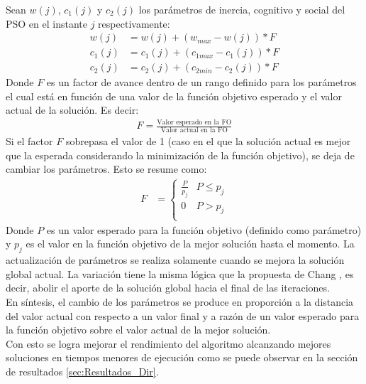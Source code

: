 Sean $w(j)$, $c_1(j)$ y $c_2(j)$ los parámetros de inercia, cognitivo y social del PSO en el instante $j$ respectivamente:  
\begin{align}\label{eq:VariationParameters_new}
    w(j) &= w(j) + (w_{max} - w(j)) * F \\\label{eq:VariationParameters_new_2}
    c_{1}(j) &= c_1(j) + (c_{1max} - c_1(j)) * F \\\label{eq:VariationParameters_new_3}
    c_{2}(j) &= c_2(j) + (c_{2min} - c_2(j)) * F
\end{align} 
Donde $F$ es un factor de avance dentro de un rango definido para los parámetros el cual está en función de una valor de la función objetivo esperado y el valor actual de la solución. Es decir: 
\begin{align}
  F = \frac{\text{Valor esperado en la FO}}{\text{Valor actual en la FO}}
\end{align}
Si el factor $F$ sobrepasa el valor de 1 (caso en el que la solución actual es mejor que la esperada considerando la minimización de la función objetivo), se deja de cambiar los parámetros. Esto se resume como:
\begin{align}\label{eq:restriction_var_par_new}
    F &= 
        \left\{
            \begin{array}{ll}
                \frac{P}{p_j}  & P \leq p_j\\
                0 & P > p_j\\
            \end{array}
        \right.
\end{align}
Donde $P$ es un valor esperado para la función objetivo (definido como parámetro) y $p_j$ es el valor en la función objetivo de la mejor solución hasta el momento. La actualización de parámetros se realiza solamente cuando se mejora la solución global actual. La variación tiene la misma lógica que la propuesta de Chang \cite{Chang10_2}, es decir, abolir el aporte de la solución global hacia el final de las iteraciones.\\
En síntesis, el cambio de los parámetros se produce en proporción a la distancia del valor actual con respecto a un valor final y a razón de un valor esperado para la función objetivo sobre el valor actual de la mejor solución.\\
 Con esto se logra mejorar el rendimiento del algoritmo alcanzando mejores soluciones en tiempos menores de ejecución como se puede observar en la sección de resultados \ref{sec:Resultados_Dir}.

